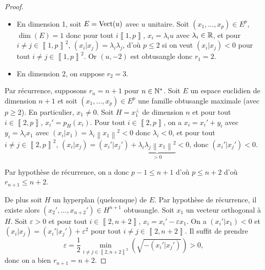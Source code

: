 \documentclass[12pt]{article}
\begin{document}
\begin{proof}
	\begin{itemize}
		\item En dimension 1, soit $E=\operatorname{Vect}(u)$ avec $u$ unitaire. Soit $(x_1,\dots,x_p)\in E^{p}$, $\dim(E)=1$ donc pour tout $i\left\llbracket1,p\right\rrbracket$, $x_i=\lambda_i u$ avec $\lambda_i\in\mathbb{R}$, et pour $i\neq j\in\left\llbracket1,p\right\rrbracket^{2}$, $(x_i|x_j)=\lambda_i\lambda_j$, d'où $p\leqslant2$ si on veut $(x_i|x_j)<0$ pour tout $i\neq j\in\left\llbracket1,p\right\rrbracket^{2}$. Or $(u,-2)$ est obtusangle donc $r_1=2$.
		\item En dimension 2, on suppose $r_2=3$.
	\end{itemize}

	Par récurrence, supposons $r_n=n+1$ pour $n\in\mathbb{N}^{*}$. Soit $E$ un espace euclidien de dimension $n+1$ et soit $(x_1,\dots,x_p)\in E^{p}$ une famille obtusangle maximale (avec $p\geqslant2$). En particulier, $x_1\neq0$. Soit $H=x_1^{\perp}$ de dimension $n$ et pour tout $i\in\left\llbracket2,p\right\rrbracket$, $x_i'=p_H(x_i)$. Pour tout $i\in\left\llbracket2,p\right\rrbracket$, on a $x_i=x_i'+y_i$ avec $y_i=\lambda_i x_1$ avec $(x_i|x_1)=\lambda_i\left\lVert x_1\right\rVert^{2}<0$ donc $\lambda_i<0$, et pour tout $i\neq j\in\left\llbracket2,p\right\rrbracket^{2}$, $(x_i|x_j)=(x_i'|x_j')+\underbrace{\lambda_i\lambda_j\left\lVert x_1\right\rVert^{2}}_{>0}<0$, donc $(x_{i}'|x_{j}')<0$.

	Par hypothèse de récurrence, on a donc $p-1\leqslant n+1$ d'où $p\leqslant n+2$ d'où $r_{n+1}\leqslant n+2$.

	De plus soit $H$ un hyperplan (quelconque) de $E$. Par hypothèse de récurrence, il existe alors $(x_2',\dots,x_{n+2}')\in H^{n+1}$ obtusangle.
	Soit $x_1$ un vecteur orthogonal à $H$. Soit $\varepsilon>0$ et pour tout $i\in\left\llbracket2,n+2\right\rrbracket$, $x_{i}=x_{i}'-\varepsilon x_1$. On a $(x_i'|x_1)<0$ et $(x_i|x_j)=(x_i'|x_j')+\varepsilon^{2}$ pour tout $i\neq j\in\left\llbracket2,n+2\right\rrbracket$. Il suffit de prendre 
	\begin{equation}
		\varepsilon=\frac{1}{2}\min_{i\neq j\in\left\llbracket2,n+2\right\rrbracket^{2}}\left(\sqrt{-(x_i'|x_j')}\right)>0,
	\end{equation}
	donc on a bien $r_{n+1}=n+2$.
\end{proof}
\end{document}
